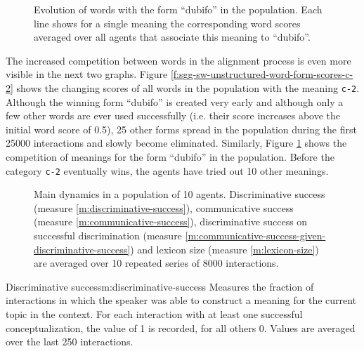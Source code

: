 \begin{figure}[t]
  \caption{Evolution of words with the form ``dubifo'' in the
    population. Each line shows for a single meaning the corresponding
    word scores averaged over all agents that associate this meaning
    to ``dubifo''. }
  \label{f:sgg-sw-unstructured-word-meaning-scores-dubifo-}
\end{figure}


\stopfiguregroup

The increased competition between words in the alignment process is
even more visible in the next two graphs. Figure
\ref{f:sgg-sw-unstructured-word-form-scores-c-2} shows the changing
scores of all words in the population with the meaning
\texttt{c-2}. Although the winning form ``dubifo'' is created very
early and although only a few other words are ever used successfully
(i.e. their score increases above the initial word score of 0.5), 25
other forms spread in the population during the first 25000
interactions and slowly become eliminated. Similarly, Figure
\ref{f:sgg-sw-unstructured-word-meaning-scores-dubifo-} shows the
competition of meanings for the form ``dubifo'' in the
population. Before the category \texttt{c-2} eventually wins, the
agents have tried out 10 other meanings.\\


\begin{figure}[t]
  \caption{Main dynamics in a population of 10 agents. Discriminative
    success (measure \ref{m:discriminative-success}), communicative
    success (measure \ref{m:communicative-success}), discriminative
    success on successful discrimination (measure
    \ref{m:communicative-success-given-discriminative-success}) and
    lexicon size (measure \ref{m:lexicon-size}) are averaged over 10
    repeated series of 8000 interactions. }
  \label{f:sgg-sw-unstructured-success+lexicon-size}
\end{figure}

\begin{measure}[b]{Discriminative success}{m:discriminative-success}
  Measures the fraction of interactions in which the speaker was able
  to construct a meaning for the current topic in the context. For
  each interaction with at least one successful conceptualization, the
  value of 1 is recorded, for all others 0. Values are averaged over
  the last 250 interactions.
\end{measure}



